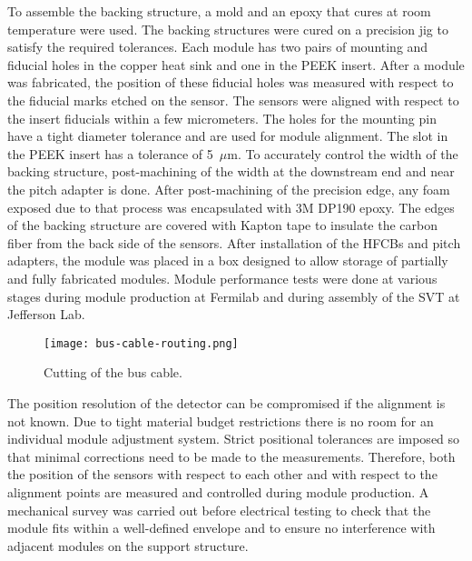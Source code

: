 To assemble the backing structure, a mold and an epoxy that cures at room temperature were used. The backing structures were cured on a precision jig to satisfy the required tolerances. Each module has two pairs of mounting and fiducial holes in the copper heat sink and one in the PEEK insert. After a module was fabricated, the position of these fiducial holes was measured with respect to the fiducial marks etched on the sensor. The sensors were aligned with respect to the insert fiducials within a few micrometers. The holes for the mounting pin have a tight diameter tolerance and are used for module alignment. The slot in the PEEK insert has a tolerance of 5~$\mu$m. To accurately control the width of the backing structure, post-machining of the width at the downstream end and near the pitch adapter is done. After post-machining of the precision edge, any foam exposed due to that process was encapsulated with 3M DP190 epoxy. The edges of the backing structure are covered with Kapton tape to insulate the carbon fiber from the back side of the sensors. After installation of the HFCBs and pitch adapters, the module was placed in a box designed to allow storage of partially and fully fabricated modules. Module performance tests were done at various stages during module production at Fermilab and during assembly of the SVT at Jefferson Lab. 

\begin{figure}[hbt] 
\centering 
\texttt{[image: bus-cable-routing.png]}
\caption{Cutting of the bus cable.}
\label{fig:bus-cable-routing}
\end{figure}

The position resolution of the detector can be compromised if the alignment is not known. Due to tight material budget restrictions there is no room for an individual module adjustment system. Strict positional tolerances are imposed so that minimal corrections need to be made to the measurements. Therefore, both the position of the sensors with respect to each other and with respect to the alignment points are measured and controlled during module production. A mechanical survey was  carried out before electrical testing to check that the module fits within a well-defined envelope and to ensure no interference with adjacent modules on the support structure.

